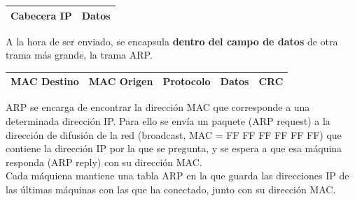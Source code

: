 \begin{table}[h] \centering \begin{tabular}{|c|c|}
\hline Cabecera IP & Datos \\ \hline \end{tabular}
\end{table}
A la hora de ser enviado, se encapsula \textbf{dentro del campo de datos} de otra trama más grande, la trama ARP.

\begin{table}[h] \centering \begin{tabular}{|l|c|c|l|l|}
\hline MAC Destino & MAC Origen & Protocolo & \textbf{Datos} & CRC \\ \hline \end{tabular}
\end{table}
\vspace{2cm}
ARP se encarga de encontrar la dirección MAC que corresponde a una determinada dirección IP. Para ello se envía un paquete (ARP request) a la dirección de difusión de la red (broadcast, MAC = FF FF FF FF FF FF) que contiene la dirección IP por la que se pregunta, y se espera a que esa máquina responda (ARP reply) con su dirección MAC.\\

Cada máquiena mantiene una tabla ARP en la que guarda las direcciones IP de las últimas máquinas con las que ha conectado, junto con su dirección MAC.
\newpage
